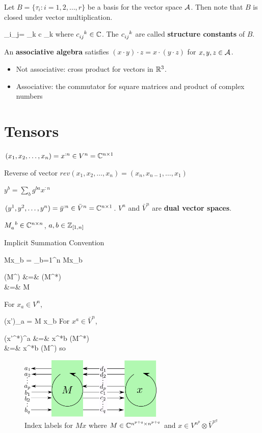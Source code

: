 Let $B = \{\tau_i: i=1, 2, \ldots, r\}$
be a basis for the vector space ${\cal A}$. 
Then note that
$B$ is closed under vector multiplication. 

\beq
\tau_i\cdot \tau_j=
\sum_k c \tau_k
\eeq
where $c\indices{_{ij}^k}\in\CC$.
The $c\indices{_{ij}^k}$ are called 
{\bf structure constants} of $B$.

An {\bf associative algebra} satisfies 
$(x\cdot y)\cdot z = x\cdot(y\cdot z)$ for
$x,y,z\in {\cal A}$.
\begin{itemize}
\item Not associative: cross product for vectors in  ${ \mathbb{R}}^3$.
\item Associative:
the commutator for square matrices and product of complex numbers
\end{itemize}

\section{Tensors}

$(x_1, x_2, \ldots, x_n) = x^{:n}\in V^n={ \mathbb{C}}^{n\times 1}$

Reverse of vector $rev(x_1, x_2, \ldots, x_n)=
(x_n, x_{n-1},
\ldots, x_1)$

$y^b = \sum_b g^{ba}x^{:n}$

$(y^1, y^2, \ldots, y^n)= \bar{y}^{:n}\in \bar{V}^n={ \mathbb{C}}^{n\times 1}$. $V^n$ and
$\bar{V}^n$ are {\bf dual vector spaces}.



$M\indices{_a^b}\in \CC^{n\times n}$, $a, b\in{\mathbb{Z}}_{[1,n]}$

Implicit Summation Convention

\beq
Mx_b = \sum_{b=1}^n
Mx_b
\eeq

\beqa
(M^\dagger) &=& (M^*)
\\
&=&
M
\quad {}
\eeqa

For $x_a\in V^n$,

\beq
(x')_a = M x_b
\eeq
For $x^a\in \bar{V}^{n}$, 



\beqa
(x'^*)^a &=& x^{*b} (M^*)
\\
&=&
x^{*b} (M^\dagger)
\eeqa
so



\begin{figure}[h!]
\centering
\includegraphics[width=2.7in]
{conventions/index-labels-Mx.png}
\caption{Index labels for $Mx$
where $M
\in { \mathbb{C}}^{n^{p+q}\times n^{p+q}}$ and
$x\in V^{n^p}\otimes \bar{V}^{n^q}$}
\label{fig-index-labels-Mx}
\end{figure}

